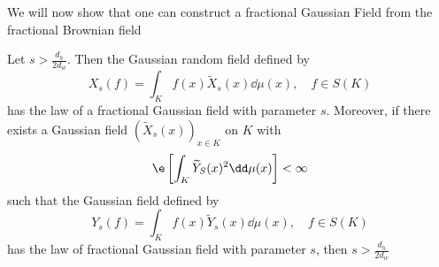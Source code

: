 We will now show that one can construct a fractional Gaussian Field from the fractional Brownian field
\begin{prop}
	Let $s > \frac{d_h}{2d_w}$. Then the Gaussian random field defined by
	\begin{equation}
		X_s(f) = \int_{K}f(x) \widetilde{X}_{s}(x) \dd \mu (x), \quad f \in S(K)
	\end{equation}
	has the law of a fractional Gaussian field with parameter $s$. Moreover, if there exists a Gaussian field $\left(\widetilde{X}_{s}(x)\right)_{x \in K}$ on $K$ with
	\begin{equation}
		\e \left[\int_{K}\widetilde{Y}_S(x)^2 \dd \mu(x)\right] < \infty
	\end{equation}
	such that the Gaussian field defined by
	\begin{equation}
				Y_s(f) = \int_{K}f(x) \widetilde{Y}_{s}(x) \dd \mu (x), \quad f \in S(K)
	\end{equation}
	has the law of fractional Gaussian field with parameter $s$, then $s > \frac{d_h}{2d_w}$
\end{prop}
